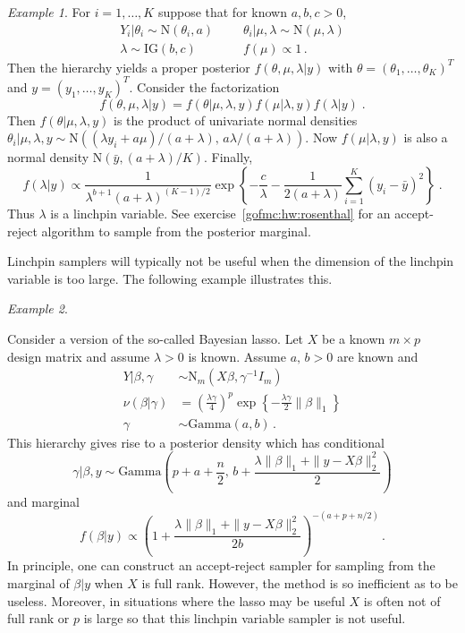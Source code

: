 \documentclass[12pt]{article}
\theoremstyle{plain}
\theoremstyle{definition}
\theoremstyle{remark}
\newtheorem{example}{Example}[section]
\begin{document}
\begin{example} \label{gofmc:ex:rosenthal}
For $i=1,\ldots, K$ suppose that for known $a, b, c > 0$,
\begin{align*}
Y_i | \theta_i  \sim  \text{N}(\theta_i, a) ~~&~~~~~ \theta_i | \mu, \lambda \sim  \text{N}(\mu, \lambda)\\
\lambda  \sim \text{IG}(b, c) ~~&~~~~~  f(\mu)  \propto 1 \, .
\end{align*}
Then the hierarchy yields a proper posterior $f(\theta, \mu, \lambda |
y)$ with $\theta=(\theta_1, \ldots, \theta_K)^T$ and $y=(y_1, \ldots,
y_K)^T$.  Consider the factorization \cite[see][]{jone:hara:caff:neat:2006} 
$$
f(\theta, \mu, \lambda | y) = f(\theta | \mu, \lambda, y) f(\mu |
\lambda, y) f(\lambda |y) \; . 
$$
Then $f(\theta | \mu, \lambda, y)$ is the product of univariate normal
densities $\theta_i | \mu, \lambda, y \sim \text{N}((\lambda y_i +
a\mu)/(a+\lambda), \, a\lambda / (a + \lambda))$.  Now $f(\mu |
\lambda, y)$ is also a normal density $\text{N}(\bar{y},
(a+\lambda)/K)$. Finally, 
$$
f(\lambda | y) \propto \frac{1}{\lambda^{b+1} (a + \lambda)^{(K-1)/2}}
\exp\left\{ - \frac{c}{\lambda} - \frac{1}{2(a+\lambda)}
  \sum_{i=1}^{K} (y_i - \bar{y})^{2}\right\} \; . 
$$
Thus $\lambda$ is a linchpin variable. See
exercise~\ref{gofmc:hw:rosenthal} for an accept-reject algorithm to
sample from the posterior marginal.   
\end{example}

Linchpin samplers will typically not be useful when the dimension of
the linchpin variable is too large.  The following example illustrates
this.

\begin{example}
  \label{gofmc:ex:Bayesian lasso}
  
  Consider a version of the so-called Bayesian lasso. Let $X$ be a
  known $m \times p$ design matrix and assume $\lambda > 0$ is known.
  Assume $a, \, b >0$ are known and
\begin{align*}
Y|\beta, \gamma & \sim \text{N}_{m}(X\beta, \gamma^{-1}I_{m}) \\
\nu(\beta|\gamma) & = \left(\frac{\lambda \gamma}{4}\right)^{p}
                    \exp\left\{ -\frac{\lambda \gamma}{2}
                    \|\beta\|_{1}\right\}\\ 
\gamma & \sim \text{Gamma}(a,b) \, .
\end{align*}
This hierarchy gives rise to a posterior density which has conditional 
$$
\gamma | \beta, y \sim \text{Gamma} \left(p + a + \frac{n}{2}, \, b +
  \frac{\lambda \|\beta\|_{1} + \|y- X\beta \|_{2}^{2}}{2}\right) 
$$
and marginal
$$
f(\beta | y) \propto \left(1 + \frac{\lambda \|\beta\|_{1} + \|y-
    X\beta \|_{2}^{2}}{2b}\right)^{-(a + p + n/2)} \, . 
$$
In principle, one can construct an accept-reject sampler for sampling
from the marginal of $\beta|y$ when $X$ is full rank.  However, the
method is so inefficient as to be useless.  Moreover, in situations
where the lasso may be useful $X$ is often not of full rank or $p$ is
large so that this linchpin variable sampler is not useful.
\end{example}
\end{document}
